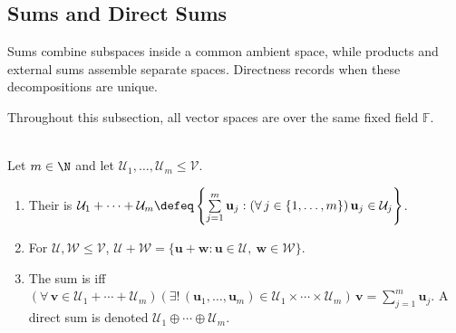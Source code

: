 \subsection{Sums and Direct Sums}
Sums combine subspaces inside a common ambient space, while products and external sums assemble separate spaces. Directness records when these decompositions are unique.

Throughout this subsection, all vector spaces are over the same fixed field $\mathbb{F}$.

\begin{definition} \label{def:finite-sums-and-direct-sums-subspaces} \\
Let $m\in\N$ and let $\mathcal{U}_1,\ldots,\mathcal{U}_m\leq\mathcal{V}$.
\begin{enumerate}[label=(\roman*)]
\setlength{\itemsep}{0pt}
\item Their  is $\mathcal{U}_1+\cdots+\mathcal{U}_m\defeq\left\{\sum\limits_{j=1}^{m}\mathbf{u}_j:(\forall\,j\in\{1,\ldots,m\})\,\mathbf{u}_j\in\mathcal{U}_j\right\}$.
\item For $\mathcal{U},\mathcal{W}\leq\mathcal{V}$, $\mathcal{U}+\mathcal{W}=\{\mathbf{u}+\mathbf{w}:\mathbf{u}\in\mathcal{U},\ \mathbf{w}\in\mathcal{W}\}$.
\item The sum is  iff $(\forall\,\mathbf{v}\in\mathcal{U}_1+\cdots+\mathcal{U}_m)(\exists!\,(\mathbf{u}_1,\ldots,\mathbf{u}_m)\in\mathcal{U}_1\times\cdots\times\mathcal{U}_m)\,\mathbf{v}=\sum\limits_{j=1}^{m}\mathbf{u}_j$. A direct sum is denoted $\mathcal{U}_1\oplus\cdots\oplus\mathcal{U}_m$.
\end{enumerate}
\end{definition}


